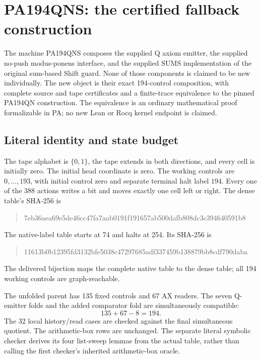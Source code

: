 \section{PA194QNS: the certified fallback construction}

The machine PA194QNS composes the supplied Q axiom emitter, the supplied
no-push modus-ponens interface, and the supplied SUMS implementation of the
original sum-based Shift guard. None of those components is claimed to be
new individually. The new object is their exact 194-control composition,
with complete source and tape certificates and a finite-trace equivalence
to the pinned PA194QN construction. The equivalence is an ordinary
mathematical proof formalizable in PA; no new Lean or Rocq kernel endpoint
is claimed.

\subsection{Literal identity and state budget}

The tape alphabet is $\{0,1\}$, the tape extends in both directions, and
every cell is initially zero. The initial head coordinate is zero. The
working controls are $0,\ldots,193$, with initial control zero and separate
terminal halt label $194$. Every one of the 388 actions writes a bit and
moves exactly one cell left or right. The dense table's SHA-256 is
\begin{quote}\ttfamily\small
7eb36aea69e5de46cc47fa7aab0191f191657ab500dafb808dc3c394640591b8
\end{quote}
The native-label table starts at 74 and halts at 254. Its SHA-256 is
\begin{quote}\ttfamily\small
11613b0b12395fd3132bfe5038c47297685adf337459b138879bb8cdf790daba
\end{quote}
The delivered bijection maps the complete native table to the dense table;
all 194 working controls are graph-reachable.

The unfolded parent has 135 fixed controls and 67 AX readers. The seven
Q-emitter folds and the added comparator fold are simultaneously compatible:
\[
 135+67-8=194.
\]
The 32 local history/read cases are checked against the final simultaneous
quotient. The arithmetic-box rows are unchanged. The separate literal
symbolic checker derives its four list-sweep lemmas from the actual table,
rather than calling the first checker's inherited arithmetic-box oracle.

